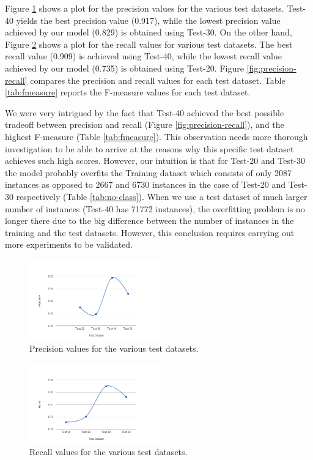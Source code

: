 \documentclass[10pt,twocolumn,letterpaper]{article}
\begin{document}
Figure \ref{fig:precision} shows a plot for the precision values for the various test datasets. Test-40 yields the best precision value (0.917), while the
lowest precision value achieved by our model (0.829) is obtained using Test-30. On the other hand, Figure \ref{fig:recall} shows a plot for the recall values
for various test datasets. The best recall value (0.909) is achieved using Test-40, while the lowest recall value achieved by our model (0.735) is obtained
using Test-20. Figure \ref{fig:precision-recall} compares the precision and recall values for each test dataset. Table \ref{tab:fmeasure} reports the F-measure
values for each test dataset.

We were very intrigued by the fact that Test-40 achieved the best possible tradeoff between precision and recall (Figure \ref{fig:precision-recall}), and the
highest F-measure (Table \ref{tab:fmeasure}). This observation needs more thorough investigation to be able to arrive at the reasons why this specific test
dataset achieves such high scores. However, our intuition is that for Test-20 and Test-30 the model probably overfits the Training dataset which consists of
only 2087 instances as opposed to 2667 and 6730 instances in the case of Test-20 and Test-30 respectively (Table \ref{tab:no-class}). When we use a test dataset
of much larger number of instances (Test-40 has 71772 instances), the overfitting problem is no longer there due to the big difference between the number of
instances in the training and the test datasets. However, this conclusion requires carrying out more experiments to be validated.

\begin{figure}[h!]
\centering
\includegraphics[width=0.5\textwidth]{imgs/precision.png}
\caption{Precision values for the various test datasets.}
\label{fig:precision}
\end{figure}

\begin{figure}[h!]
\centering
\includegraphics[width=0.5\textwidth]{imgs/recall.png}
\caption{Recall values for the various test datasets.}
\label{fig:recall}
\end{figure}
\end{document}

